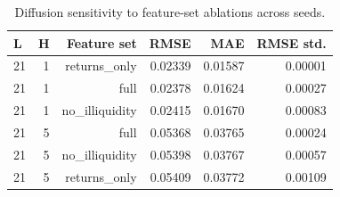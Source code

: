 \begin{table}[!htbp]
\centering
\caption{Diffusion sensitivity to feature-set ablations across seeds.}
\label{tab:diffusion-ablation}
\begin{tabular}{lrrrrr}
\toprule
L & H & Feature set & RMSE & MAE & RMSE std. \\
\midrule
21 & 1 & returns\_only & 0.02339 & 0.01587 & 0.00001 \\
21 & 1 & full & 0.02378 & 0.01624 & 0.00027 \\
21 & 1 & no\_illiquidity & 0.02415 & 0.01670 & 0.00083 \\
21 & 5 & full & 0.05368 & 0.03765 & 0.00024 \\
21 & 5 & no\_illiquidity & 0.05398 & 0.03767 & 0.00057 \\
21 & 5 & returns\_only & 0.05409 & 0.03772 & 0.00109 \\
\bottomrule
\end{tabular}
\end{table}
